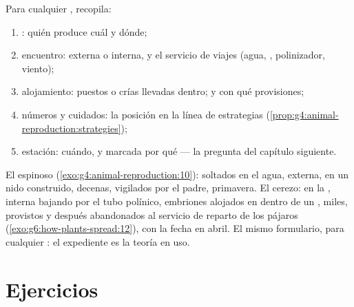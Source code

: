 \begin{method}\label{met:g8:sexual-reproduction:dossier}
Para cualquier , recopila:
\begin{enumerate}
  \item {}: quién produce cuál y dónde;
  \item encuentro:  externa o interna, y el servicio de
        viajes (agua, , polinizador, viento);
  \item alojamiento:  puestos o crías llevadas dentro; y con qué
        provisiones;
  \item números y cuidados: la posición en la línea de estrategias
        (\cref{prop:g4:animal-reproduction:strategies});
  \item estación: cuándo, y marcada por qué --- la pregunta del
        capítulo siguiente.
\end{enumerate}
\end{method}

\begin{example}\label{ex:g8:sexual-reproduction:dossiers}
El espinoso (\cref{exo:g4:animal-reproduction:10}):  soltados en
el agua,  externa,  en un nido construido, decenas,
vigilados por el padre, primavera. El cerezo:  en la ,
 interna bajando por el tubo polínico, embriones alojados en
 dentro de un , miles, provistos y después abandonados al
servicio de reparto de los pájaros
(\cref{exo:g6:how-plants-spread:12}), con la fecha en abril. El mismo
formulario, para cualquier : el expediente es la teoría en uso.
\end{example}

\section{Ejercicios}

